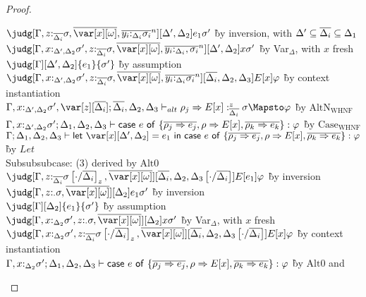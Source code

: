 \begin{proof}
\begin{tabbing}
       $\judg[\G, z{:}_{\ov{\Delta_i}} \sigma,\ov{\xo},\ov{y_i{:}_{\D_i}\s_i}^n][\D',\D_2]{e_1}{\sigma'}$
       \` by inversion, with $\Delta' \subseteq \overline{\Delta_i} \subseteq \Delta_1$\\
       $\judg[\G, x{:}_{\D',\D_2}\sigma', z{:}_{\ov{\Delta_i}} \sigma,\ov{\xo},\ov{y_i{:}_{\D_i},\s_i}^n][\D',\D_2]{x}{\sigma'}$
       \` by Var$_\Delta$, with $x$ fresh\\
      $\judg[\G][\D',\D_2]{e_1}{\sigma'}$
       \` by assumption\\
       $\judg[\G,
       x{:}_{\D',\D_2}\sigma', z{:}_{\ov{\Delta_i}} \sigma,\ov{\xo},\ov{y_i{:}_{\D_i}\s_i}^n][\ov{\D_i},\D_2,\D_3]{E[x]}{\vp}$
       \` by context instantiation\\
       $\G,x{:}_{\D',\D_2}\sigma',\var[z][\ov{\D_i}];\ov{\D_i},\D_2,\D_3 \vdash_{alt} \rho_j
       \Rightarrow E[x] :^z_{\ov{\D_i}} \s \Mapsto \vp$ \` by
       $\textrm{AltN}_{\textrm{WHNF}}$\\
       $\Gamma,x{:}_{\Delta',\Delta_2}\sigma'; \Delta_1,\Delta_2,\Delta_3 \vdash \mathsf{case}~e~\mathsf{of}~\{\overline{\rho_j\Rightarrow e_j}, \rho \Rightarrow
  E[x], \overline{\rho_k\Rightarrow e_k}\} : \varphi$ \` by $\textrm{Case}_\textrm{WHNF}$\\
       $\G ; \D_1 , \D_2 , \D_3 \vdash \llet{\x[\D',\D_2] = e_1}{\ccase{e}{\{\overline{\rho_j\Rightarrow e_j}, \rho \Rightarrow
           E[x], \overline{\rho_k\Rightarrow e_k}\}}} : \vp$ \` by $\mathit{Let}$\\
       Subsubsubcase: (3) derived by $\textrm{Alt}0$\\
       $\judg[\subst{\G, z{:}_{\ov{\Delta_i}} \sigma}{\cdot}{\ov{\D_i}}_z,\ov{\xo}][\subst{\ov{\D_i},\D_2,\D_3}{\cdot}{\ov{\D_i}}]{E[e_1]}{\vp}$
       \` by inversion\\
       $\judg[\G,z{:}_{\cdot}\s,\ov{\xo}][\D_2]{e_1}{\sigma'}$
       \` by inversion\\
       $\judg[\G][\D_2]{e_1}{\sigma'}$ \` by assumption\\
       $\judg[\G,x{:}_{\D_2}\sigma' , z{:}_{\cdot}\s,\ov{\xo}][\D_2]{x}{\sigma'}$ \` by Var$_\Delta$, with $x$ fresh\\
       $\judg[\subst{\G,x{:}_{\D_2}\sigma', z{:}_{\ov{\Delta_i}}
         \sigma }{\cdot}{\ov{\D_i}}_z,\ov{\xo}][\subst{\ov{\D_i},\D_2,\D_3}{\cdot}{\ov{\D_i}}]{E[x]}{\vp}$
       \` by context instantiation\\
             $\Gamma,x{:}_{\Delta_2}\sigma'; \Delta_1,\Delta_2,\Delta_3 \vdash \mathsf{case}~e~\mathsf{of}~\{\overline{\rho_j\Rightarrow e_j}, \rho \Rightarrow
  E[x], \overline{\rho_k\Rightarrow e_k}\} : \varphi$ \` by $\textrm{Alt}0$ and

\end{tabbing}
\end{proof}
